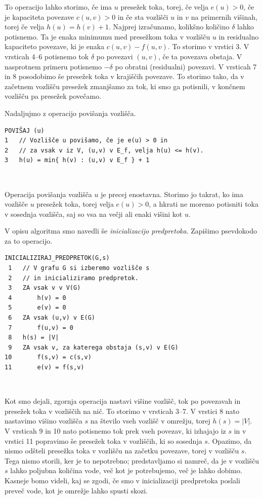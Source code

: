 \documentclass[mat1]{fmfdelo}
\begin{document}
To operacijo lahko storimo, če ima $u$ presežek toka, torej, če velja $e(u) > 0$, če je kapaciteta povezave $c(u,v) > 0$ in če sta vozlišči $u$ in $v$ na primernih višinah, torej če velja $h(u) = h(v) + 1$. Najprej izračunamo, kolikšno količino $\delta$ lahko potisnemo. Ta je enaka minimumu med presežkom toka v vozlišču $u$ in residualno kapaciteto povezave, ki je enaka $c(u,v) - f(u,v)$. To storimo v vrstici 3. V vrsticah 4--6 potisnemo tok $\delta$ po povezavi $(u,v)$, če ta povezava obstaja. V nasprotnem primeru potisnemo $-\delta$ po obratni (residualni) povezavi. V vrsticah 7 in 8 posodobimo še presežek toka v krajiščih povezave. To storimo tako, da v začetnem vozlišču presežek zmanjšamo za tok, ki smo ga potisnili, v končnem vozlišču pa presežek povečamo.

Nadaljujmo z operacijo povišanja vozlišča.\\

\begin{verbatim}
POVIŠAJ (u)
1   // Vozlišče u povišamo, če je e(u) > 0 in
2   // za vsak v iz V, (u,v) v E_f, velja h(u) <= h(v).
3   h(u) = min{ h(v) : (u,v) v E_f } + 1
\end{verbatim}~

Operacija povišanja vozlišča $u$ je precej enostavna. Storimo jo takrat, ko ima vozlišče $u$ presežek toka, torej velja $e(u) > 0$, a hkrati ne moremo potisniti toka v sosednja vozlišča, saj so vsa na večji ali enaki višini kot $u$.

V opisu algoritma smo navedli še \textit{inicializacijo predpretoka}. Zapišimo psevdokodo za to operacijo.\\

\begin{verbatim}
INICIALIZIRAJ_PREDPRETOK(G,s)
 1   // V grafu G si izberemo vozlišče s
 2   // in inicializiramo predpretok.
 3   ZA vsak v v V(G)
 4       h(v) = 0
 5       e(v) = 0
 6   ZA vsak (u,v) v E(G)
 7       f(u,v) = 0
 8   h(s) = |V|
 9   ZA vsak v, za katerega obstaja (s,v) v E(G)
10       f(s,v) = c(s,v)
11       e(v) = f(s,v)
\end{verbatim}~

Kot smo dejali, zgornja operacija nastavi višine vozlišč, tok po povezavah in presežek toka v vozliščih na nič. To storimo v vrsticah 3--7. V vrstici 8 nato nastavimo višino vozlišča $s$ na število vseh vozlišč v omrežju, torej $h(s) = |V|$. V vrsticah 9 in 10 nato potisnemo tok prek vseh povezav, ki izhajajo iz $s$ in v vrstici 11 popravimo še presežek toka v vozliščih, ki so sosednja $s$. Opazimo, da nismo odšteli presežka toka v vozlišču na začetku povezave, torej v vozlišču $s$. Tega nismo storili, ker je to nepotrebno; predstavljamo si namreč, da je v vozlišču $s$ lahko poljubna količina vode, več kot je potrebujemo, več je lahko dobimo. Kasneje bomo videli, kaj se zgodi, če smo v inicializaciji predpretoka poslali preveč vode, kot je omrežje lahko spusti skozi.
\end{document}
